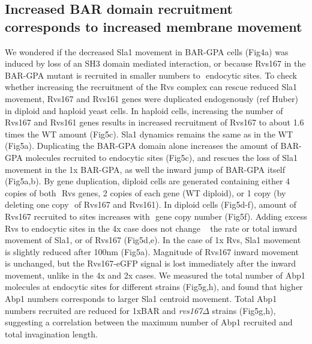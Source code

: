 \documentclass[9pt,lineno]{elife}
\begin{document}
\subsection{Increased BAR domain recruitment corresponds to increased membrane movement}
We wondered if the decreased Sla1 movement in BAR-GPA cells (Fig4a) was induced by loss of an SH3 domain mediated interaction, or because Rvs167 in the BAR-GPA mutant is recruited in smaller numbers to  endocytic sites. To check whether increasing the recruitment of the Rvs complex can rescue reduced Sla1 movement, Rvs167 and Rvs161 genes were duplicated endogenously (ref Huber) in diploid and haploid yeast cells. In haploid cells, increasing the number of Rvs167 and Rvs161 genes results in increased recruitment of Rvs167 to about 1.6 times the WT amount (Fig5c). Sla1 dynamics remains the same as in the WT (Fig5a). Duplicating the BAR-GPA domain alone increases the amount of BAR-GPA molecules recruited to endocytic sites (Fig5c), and rescues the loss of Sla1 movement in the 1x BAR-GPA, as well the inward jump of BAR-GPA itself (Fig5a,b). By gene duplication, diploid cells are generated containing either 4 copies of both  Rvs genes, 2 copies of each gene (WT diploid), or 1 copy (by deleting one copy  of Rvs167 and Rvs161). In diploid cells (Fig5d-f), amount of Rvs167 recruited to sites increases with  gene copy number (Fig5f). Adding excess Rvs to endocytic sites in the 4x case does not change   the rate or total inward movement of Sla1, or of Rvs167 (Fig5d,e). In the case of 1x Rvs, Sla1 movement is slightly reduced after 100nm (Fig5a). Magnitude of Rvs167 inward movement is unchanged, but the Rvs167-eGFP signal is lost immediately after the inward movement, unlike in the 4x and 2x cases.
We measured the total number of Abp1 molecules at endocytic sites for different strains (Fig5g,h), and found that higher Abp1 numbers corresponds to larger Sla1 centroid movement. Total Abp1 numbers recruited are reduced for 1xBAR and \textit{rvs167$\Delta$} strains (Fig5g,h), suggesting a correlation between the maximum number of Abp1 recruited and total invagination length.  
\end{document}

